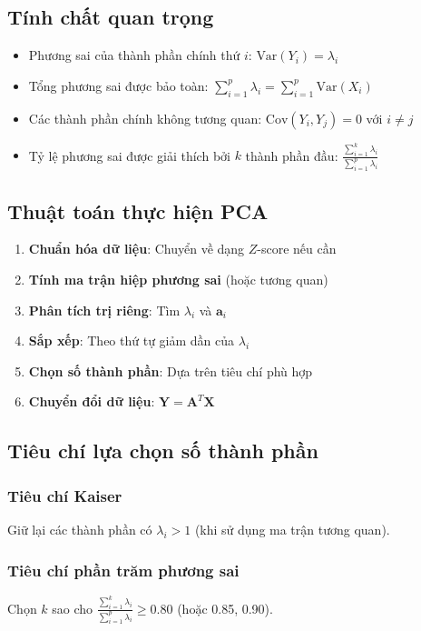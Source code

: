 \subsection{Tính chất quan trọng}
\begin{tinhchat}
\begin{itemize}
    \item Phương sai của thành phần chính thứ $i$: $\text{Var}(Y_i) = \lambda_i$
    \item Tổng phương sai được bảo toàn: $\sum_{i=1}^p \lambda_i = \sum_{i=1}^p \text{Var}(X_i)$
    \item Các thành phần chính không tương quan: $\text{Cov}(Y_i, Y_j) = 0$ với $i \neq j$
    \item Tỷ lệ phương sai được giải thích bởi $k$ thành phần đầu: $\frac{\sum_{i=1}^k \lambda_i}{\sum_{i=1}^p \lambda_i}$
\end{itemize}
\end{tinhchat}

\subsection{Thuật toán thực hiện PCA}
\begin{enumerate}
    \item \textbf{Chuẩn hóa dữ liệu}: Chuyển về dạng $Z$-score nếu cần
    \item \textbf{Tính ma trận hiệp phương sai} (hoặc tương quan)
    \item \textbf{Phân tích trị riêng}: Tìm $\lambda_i$ và $\mathbf{a}_i$
    \item \textbf{Sắp xếp}: Theo thứ tự giảm dần của $\lambda_i$
    \item \textbf{Chọn số thành phần}: Dựa trên tiêu chí phù hợp
    \item \textbf{Chuyển đổi dữ liệu}: $\mathbf{Y} = \mathbf{A}^T\mathbf{X}$
\end{enumerate}

\subsection{Tiêu chí lựa chọn số thành phần}
\subsubsection*{Tiêu chí Kaiser}
Giữ lại các thành phần có $\lambda_i > 1$ (khi sử dụng ma trận tương quan).

\subsubsection*{Tiêu chí phần trăm phương sai}
Chọn $k$ sao cho $\frac{\sum_{i=1}^k \lambda_i}{\sum_{i=1}^p \lambda_i} \geq 0.80$ (hoặc 0.85, 0.90).

